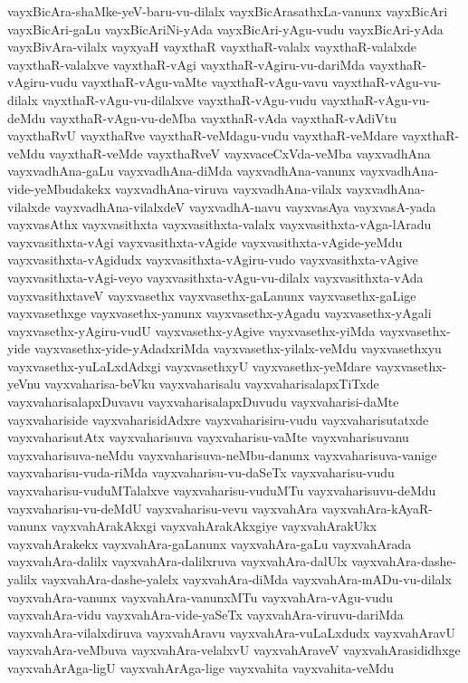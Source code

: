 {vayxBicAra-shaMke-yeV-baru-vu-dilalx
vayxBicArasathxLa-vanunx
vayxBicAri
vayxBicAri-gaLu
vayxBicAriNi-yAda
vayxBicAri-yAgu-vudu
vayxBicAri-yAda
vayxBivAra-vilalx
vayxyaH
vayxthaR
vayxthaR-valalx
vayxthaR-valalxde
vayxthaR-valalxve
vayxthaR-vAgi
vayxthaR-vAgiru-vu-dariMda
vayxthaR-vAgiru-vudu
vayxthaR-vAgu-vaMte
vayxthaR-vAgu-vavu
vayxthaR-vAgu-vu-dilalx
vayxthaR-vAgu-vu-dilalxve
vayxthaR-vAgu-vudu
vayxthaR-vAgu-vu-deMdu
vayxthaR-vAgu-vu-deMba
vayxthaR-vAda
vayxthaR-vAdiVtu
vayxthaRvU
vayxthaRve
vayxthaR-veMdagu-vudu
vayxthaR-veMdare
vayxthaR-veMdu
vayxthaR-veMde
vayxthaRveV
vayxvaceCxVda-veMba
vayxvadhAna
vayxvadhAna-gaLu
vayxvadhAna-diMda
vayxvadhAna-vanunx
vayxvadhAna-vide-yeMbudakekx
vayxvadhAna-viruva
vayxvadhAna-vilalx
vayxvadhAna-vilalxde
vayxvadhAna-vilalxdeV
vayxvadhA-navu
vayxvasAya
vayxvasA-yada
vayxvasAthx
vayxvasithxta
vayxvasithxta-valalx
vayxvasithxta-vAga-lAradu
vayxvasithxta-vAgi
vayxvasithxta-vAgide
vayxvasithxta-vAgide-yeMdu
vayxvasithxta-vAgidudx
vayxvasithxta-vAgiru-vudo
vayxvasithxta-vAgive
vayxvasithxta-vAgi-veyo
vayxvasithxta-vAgu-vu-dilalx
vayxvasithxta-vAda
vayxvasithxtaveV
vayxvasethx
vayxvasethx-gaLanunx
vayxvasethx-gaLige
vayxvasethxge
vayxvasethx-yanunx
vayxvasethx-yAgadu
vayxvasethx-yAgali
vayxvasethx-yAgiru-vudU
vayxvasethx-yAgive
vayxvasethx-yiMda
vayxvasethx-yide
vayxvasethx-yide-yAdadxriMda
vayxvasethx-yilalx-veMdu
vayxvasethxyu
vayxvasethx-yuLaLxdAdxgi
vayxvasethxyU
vayxvasethx-yeMdare
vayxvasethx-yeVnu
vayxvaharisa-beVku
vayxvaharisalu
vayxvaharisalapxTiTxde
vayxvaharisalapxDuvavu
vayxvaharisalapxDuvudu
vayxvaharisi-daMte
vayxvahariside
vayxvaharisidAdxre
vayxvaharisiru-vudu
vayxvaharisutatxde
vayxvaharisutAtx
vayxvaharisuva
vayxvaharisu-vaMte
vayxvaharisuvanu
vayxvaharisuva-neMdu
vayxvaharisuva-neMbu-danunx
vayxvaharisuva-vanige
vayxvaharisu-vuda-riMda
vayxvaharisu-vu-daSeTx
vayxvaharisu-vudu
vayxvaharisu-vuduMTalalxve
vayxvaharisu-vuduMTu
vayxvaharisuvu-deMdu
vayxvaharisu-vu-deMdU
vayxvaharisu-vevu
vayxvahAra
vayxvahAra-kAyaR-vanunx
vayxvahArakAkxgi
vayxvahArakAkxgiye
vayxvahArakUkx
vayxvahArakekx
vayxvahAra-gaLanunx
vayxvahAra-gaLu
vayxvahArada
vayxvahAra-dalilx
vayxvahAra-dalilxruva
vayxvahAra-dalUlx
vayxvahAra-dashe-yalilx
vayxvahAra-dashe-yalelx
vayxvahAra-diMda
vayxvahAra-mADu-vu-dilalx
vayxvahAra-vanunx
vayxvahAra-vanunxMTu
vayxvahAra-vAgu-vudu
vayxvahAra-vidu
vayxvahAra-vide-yaSeTx
vayxvahAra-viruvu-dariMda
vayxvahAra-vilalxdiruva
vayxvahAravu
vayxvahAra-vuLaLxdudx
vayxvahAravU
vayxvahAra-veMbuva
vayxvahAra-velalxvU
vayxvahAraveV
vayxvahArasididhxge
vayxvahArAga-ligU
vayxvahArAga-lige
vayxvahita
vayxvahita-veMdu
}

